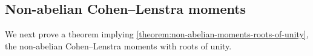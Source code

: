 \documentclass[12 pt]{amsart}
\theoremstyle{plain}
\theoremstyle{definition}
\theoremstyle{remark}
\numberwithin{equation}{section}
\newcommand{\chur}[4]{[\operatorname{CHur}^{#1, #3}_{#2,#4}/#1]}
\begin{document}

\subsection{Non-abelian Cohen--Lenstra moments}
\label{subsection:non-abelian}

We next prove a theorem implying
\autoref{theorem:non-abelian-moments-roots-of-unity}, the non-abelian
Cohen--Lenstra moments with roots of unity.
\end{document}
